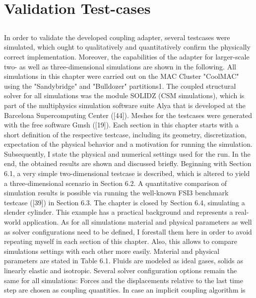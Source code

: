 \chapter{Validation Test-cases}
\label{cha:tests}


\section{}

In order to validate the developed coupling adapter, several testcases were simulated, which ought to
qualitatively and quantitatively confirm the physically correct implementation. Moreover, the capabilities
of the adapter for larger-scale two- as well as three-dimensional simulations are shown in the following.
All simulations in this chapter were carried out on the MAC Cluster "CoolMAC" using the "Sandybridge"
and "Bulldozer" partitions1. The coupled structural solver for all simulations was the module SOLIDZ
(CSM simulations), which is part of the multiphysics simulation software suite Alya that is developed
at the Barcelona Supercomputing Center ([44]). Meshes for the testcases were generated with the free
software Gmsh ([19]).
Each section in this chapter starts with a short definition of the respective testcase, including its geometry,
discretization, expectation of the physical behavior and a motivation for running the simulation.
Subsequently, I state the physical and numerical settings used for the run. In the end, the obtained
results are shown and discussed briefly.
Beginning with Section 6.1, a very simple two-dimensional testcase is described, which is altered to yield a
three-dimensional scenario in Section 6.2. A quantitative comparison of simulation results is possible via
running the well-known FSI3 benchmark testcase ([39]) in Section 6.3. The chapter is closed by Section
6.4, simulating a slender cylinder. This example has a practical background and represents a real-world
application.
As for all simulations material and physical parameters as well as solver configurations need to be defined,
I forestall them here in order to avoid repeating myself in each section of this chapter. Also, this allows
to compare simulations settings with each other more easily. Material and physical parameters are stated
in Table 6.1. Fluids are modeled as ideal gases, solids as linearly elastic and isotropic.
Several solver configuration options remain the same for all simulations: Forces and the displacements
relative to the last time step are chosen as coupling quantities. In case an implicit coupling algorithm is
